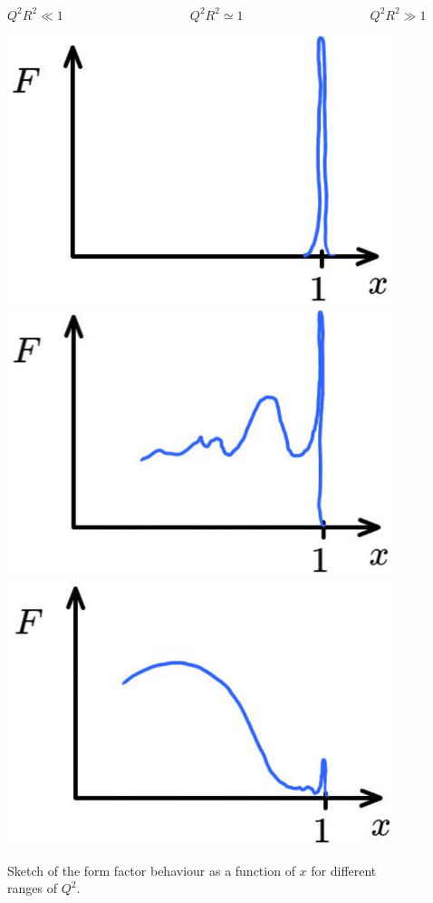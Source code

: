\documentclass[12pt]{article}
\begin{document}
\begin{figure}
\[
Q^2R^2\ll 1\qquad\qquad \qquad\qquad\qquad 
Q^2R^2\simeq 1\qquad \qquad \qquad\qquad \qquad
Q^2R^2\gg 1
\]
\begin{center}\includegraphics[scale=0.25]{images/DISinelastic1.png}
\includegraphics[scale=0.25]{images/DISinelastic2.png}
\includegraphics[scale=0.25]{images/DISinelastic3.png}
\end{center}
\caption{Sketch of the form factor behaviour as a function of $x$ for different ranges of $Q^2$.}\label{fig:DISinelastic}
\end{figure}
\end{document}
